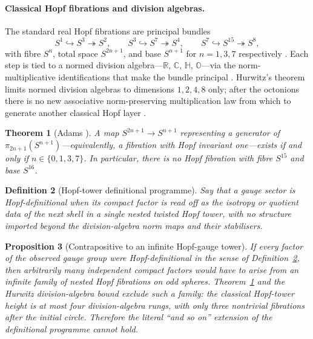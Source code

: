 \documentclass[11pt]{amsart}
\newtheorem{theorem}{Theorem}[section]
\newtheorem{proposition}[theorem]{Proposition}
\newtheorem{definition}[theorem]{Definition}
\begin{document}
\paragraph{Classical Hopf fibrations and division algebras.}
The standard real Hopf fibrations are principal bundles
\[
  S^1 \hookrightarrow S^3 \twoheadrightarrow S^2,\qquad
  S^3 \hookrightarrow S^7 \twoheadrightarrow S^4,\qquad
  S^7 \hookrightarrow S^{15} \twoheadrightarrow S^8,
\]
with fibre $S^n$, total space $S^{2n+1}$, and base $S^{n+1}$ for $n=1,3,7$ respectively \cite{hopf1931,Husemoller1994,Milnor1956,steenrod1951}. Each step is tied to a normed division algebra---$\mathbb{R}$, $\mathbb{C}$, $\mathbb{H}$, $\mathbb{O}$---via the norm-multiplicative identifications that make the bundle principal \cite{baez2002octonions,Dixon1994}. Hurwitz's theorem limits normed division algebras to dimensions $1,2,4,8$ only; after the octonions there is no new associative norm-preserving multiplication law from which to generate another classical Hopf layer \cite{baez2002octonions}.

\begin{theorem}[Adams \cite{Adams1960}]
\label{thm:adams-hopf-ceiling}
A map $S^{2n+1}\to S^{n+1}$ representing a generator of $\pi_{2n+1}(S^{n+1})$---equivalently, a fibration with Hopf invariant one---exists if and only if $n\in\{0,1,3,7\}$. In particular, there is no Hopf fibration with fibre $S^{15}$ and base $S^{16}$.
\end{theorem}

\begin{definition}[Hopf-tower definitional programme]
\label{def:hopf-tower-programme}
Say that a gauge sector is \emph{Hopf-definitional} when its compact factor is read off as the isotropy or quotient data of the next shell in a single nested twisted Hopf tower, with no structure imported beyond the division-algebra norm maps and their stabilisers.
\end{definition}

\begin{proposition}[Contrapositive to an infinite Hopf-gauge tower]
\label{prop:hopf-tower-contrapositive}
If every factor of the observed gauge group were Hopf-definitional in the sense of Definition~\ref{def:hopf-tower-programme}, then arbitrarily many independent compact factors would have to arise from an infinite family of nested Hopf fibrations on odd spheres. Theorem~\ref{thm:adams-hopf-ceiling} and the Hurwitz division-algebra bound exclude such a family: the classical Hopf-tower height is at most four division-algebra rungs, with only three nontrivial fibrations after the initial circle. Therefore the literal ``and so on'' extension of the definitional programme cannot hold.
\end{proposition}
\end{document}
